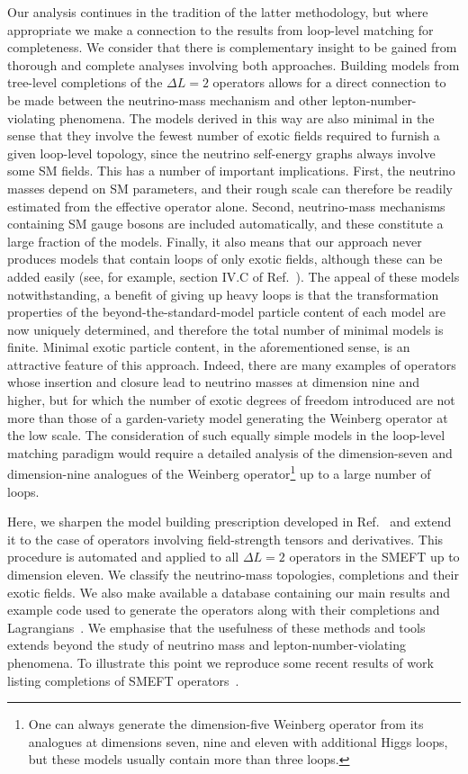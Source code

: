 Our analysis continues in the tradition of the latter methodology, but where
appropriate we make a connection to the results from loop-level matching for
completeness. We consider that there is complementary insight to be gained from
thorough and complete analyses involving both approaches. Building models from
tree-level completions of the $\Delta L = 2$ operators allows for a direct
connection to be made between the neutrino-mass mechanism and other
lepton-number-violating phenomena. The models derived in this way are also
minimal in the sense that they involve the fewest number of exotic fields
required to furnish a given loop-level topology, since the neutrino self-energy
graphs always involve some SM fields. This has a number of important
implications. First, the neutrino masses depend on SM parameters, and their
rough scale can therefore be readily estimated from the effective operator
alone. Second, neutrino-mass mechanisms containing SM gauge bosons are included
automatically, and these constitute a large fraction of the models. Finally, it
also means that our approach never produces models that contain loops of only
exotic fields, although these can be added easily (see, for example, section
IV.C of Ref.~\cite{PhysRevD.87.073007}). The appeal of these models
notwithstanding, a benefit of giving up heavy loops is that the transformation
properties of the beyond-the-standard-model particle content of each model are
now uniquely determined, and therefore the total number of minimal models is
finite. Minimal exotic particle content, in the aforementioned sense, is an
attractive feature of this approach. Indeed, there are many examples of
operators whose insertion and closure lead to neutrino masses at dimension nine
and higher, but for which the number of exotic degrees of freedom introduced are
not more than those of a garden-variety model generating the Weinberg operator
at the low scale. The consideration of such equally simple models in the
loop-level matching paradigm would require a detailed analysis of the
dimension-seven and dimension-nine analogues of the Weinberg
operator\footnote{One can always generate the dimension-five Weinberg operator
  from its analogues at dimensions seven, nine and eleven with additional Higgs
  loops, but these models usually contain more than three loops.} up to a large
number of loops.

Here, we sharpen the model building prescription developed in
Ref.~\cite{PhysRevD.87.073007} and extend it to the case of operators involving
field-strength tensors and derivatives. This procedure is automated and applied
to all $\Delta L = 2$ operators in the SMEFT up to dimension eleven. We classify
the neutrino-mass topologies, completions and their exotic fields. We also make
available a database containing our main results and example code used to
generate the operators along with their completions and
Lagrangians~\cite{neutrinomass2020}. We emphasise that the usefulness of these
methods and tools extends beyond the study of neutrino mass and
lepton-number-violating phenomena. To illustrate this point we reproduce some
recent results of work listing completions of SMEFT
operators~\cite{deBlas:2017xtg}.

